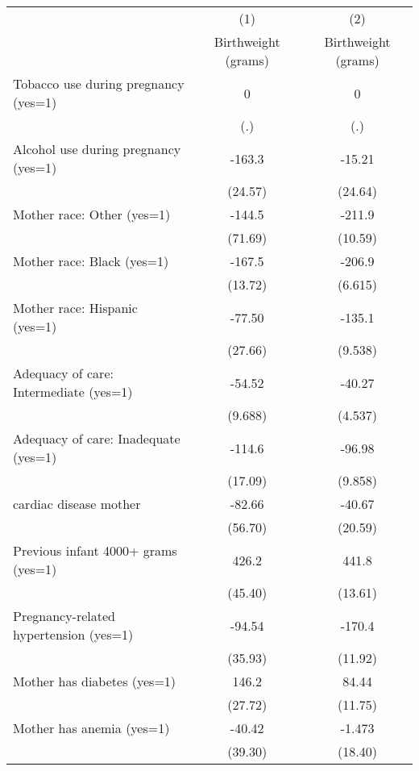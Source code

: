 \begin{tabular}{l*{2}{c}}
\hline\hline
                    &\multicolumn{1}{c}{(1)}&\multicolumn{1}{c}{(2)}\\
                    &\multicolumn{1}{c}{Birthweight (grams)}&\multicolumn{1}{c}{Birthweight (grams)}\\
\hline
Tobacco use during pregnancy (yes=1)&           0&           0\\
                    &         (.)&         (.)\\
[1em]
Alcohol use during pregnancy (yes=1)&      -163.3&      -15.21\\
                    &     (24.57)&     (24.64)\\
[1em]
Mother race: Other (yes=1)&      -144.5&      -211.9\\
                    &     (71.69)&     (10.59)\\
[1em]
Mother race: Black (yes=1)&      -167.5&      -206.9\\
                    &     (13.72)&     (6.615)\\
[1em]
Mother race: Hispanic (yes=1)&      -77.50&      -135.1\\
                    &     (27.66)&     (9.538)\\
[1em]
Adequacy of care: Intermediate (yes=1)&      -54.52&      -40.27\\
                    &     (9.688)&     (4.537)\\
[1em]
Adequacy of care: Inadequate (yes=1)&      -114.6&      -96.98\\
                    &     (17.09)&     (9.858)\\
[1em]
cardiac disease mother&      -82.66&      -40.67\\
                    &     (56.70)&     (20.59)\\
[1em]
Previous infant 4000+ grams (yes=1)&       426.2&       441.8\\
                    &     (45.40)&     (13.61)\\
[1em]
Pregnancy-related hypertension (yes=1)&      -94.54&      -170.4\\
                    &     (35.93)&     (11.92)\\
[1em]
Mother has diabetes (yes=1)&       146.2&       84.44\\
                    &     (27.72)&     (11.75)\\
[1em]
Mother has anemia (yes=1)&      -40.42&      -1.473\\
                    &     (39.30)&     (18.40)\\

\end{tabular}
